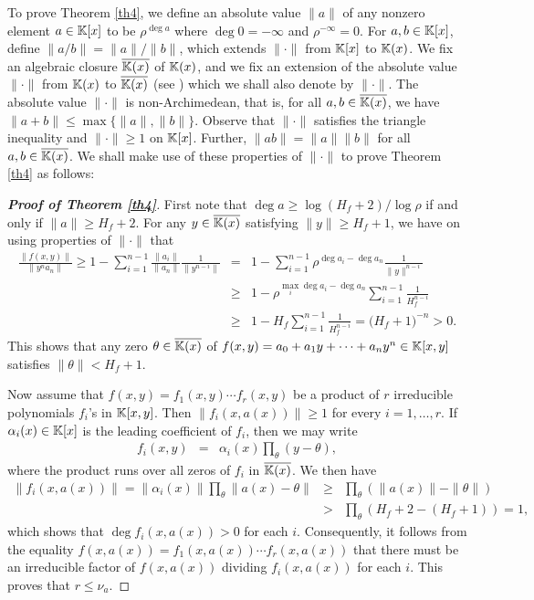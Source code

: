 \documentclass[12pt,reqno]{amsart}%
\begin{document}
To prove Theorem \ref{th4}, we define an absolute value $\|a\|$ of any nonzero element $a\in \mathbb{K}[x]$ to be $\rho^{\deg a}$ where $\deg 0=-\infty$ and $\rho^{-\infty}=0$. For $a,b\in \mathbb{K}[x]$, define $\|a/b\|=\|a\|/\|b\|$, which extends $\|\cdot\|$ from $\mathbb{K}[x]$ to $\mathbb{K}(x)$. We fix an algebraic closure $\overline{\mathbb{K}(x)}$ of $\mathbb{K}(x)$, and we fix an extension of the absolute value $\|\cdot\|$ from $\mathbb{K}(x)$ to $\overline{\mathbb{K}(x)}$ (see \cite{EP}) which we shall also denote by $\|\cdot\|$. The absolute value $\|\cdot\|$ is non-Archimedean, that is, for all $a,b\in \overline{\mathbb{K}(x)}$, we have $\|a+b\|\leq \max\{\|a\|,\|b\|\}$. Observe that $\|\cdot\|$ satisfies the triangle inequality and $\|\cdot\|\geq 1$ on $\mathbb{K}[x]$. Further, $\|ab\|=\|a\|\|b\|$ for all $a,b\in \overline{\mathbb{K}(x)}$. We shall make use of these properties of $\|\cdot\|$ to prove Theorem \ref{th4} as follows:
\begin{proof}[\bf Proof of Theorem \ref{th4}] First note that $\deg a\geq  \log (H_f+2)/\log \rho$ if and only if $\|a\|\geq H_f+2$.  For any $y\in \overline{\mathbb{K}(x)}$ satisfying $\|y\|\geq H_f+1$, we have on using properties of $\|\cdot\|$ that
\begin{eqnarray*}
\frac{\|f(x,y)\|}{\|y^n a_n\|} \geq 1-\sum_{i=1}^{n-1}\frac{\|a_i\|}{\|a_n\|}\frac{1}{\|y^{n-i}\|}
 &= & 1-\sum_{i=1}^{n-1}\rho^{\deg a_i-\deg a_n}\frac{1}{\|y\|^{n-i}}\\
 &\geq & 1-\rho^{\max_{i}\deg a_i-\deg a_n}\sum_{i=1}^{n-1}\frac{1}{H_f^{n-i}}\\
   &\geq & 1-H_f\sum_{i=1}^{n-1}\frac{1}{H_f^{n-i}}= \bigl(H_f+1\bigr)^{-n}>0.
\end{eqnarray*}
This shows that any zero $\theta\in \overline{\mathbb{K}(x)}$ of $f(x,y)=a_0+a_1 y+\cdots+a_ny^n\in \mathbb{K}[x,y]$ satisfies $\|\theta\|<H_f+1$.

Now assume that $f(x,y)=f_1(x,y)\cdots f_r(x,y)$ be a product of $r$ irreducible polynomials $f_i$'s in $\mathbb{K}[x,y]$. Then $\|f_i(x,a(x))\|\geq 1$ for every $i=1,\ldots,r$. If $\alpha_i(x)\in \mathbb{K}[x]$ is the leading coefficient of $f_i$, then we may write
\begin{eqnarray*}
f_i(x,y) &=& \alpha_i(x)\prod_{\theta} (y-\theta),
\end{eqnarray*}
where the product runs over all zeros of $f_i$ in $\overline{\mathbb{K}(x)}$. We then have
\begin{eqnarray*}
\|f_i(x,a(x))\| = \|\alpha_i(x)\|\prod_{\theta} \|a(x)-\theta\|&\geq& \prod_{\theta} (\|a(x)\|-\|\theta\|)\\
&>& \prod_{\theta} (H_f+2-(H_f+1))=1,
\end{eqnarray*}
which shows that $\deg f_i(x,a(x))>0$ for each $i$. Consequently, it follows from the equality $f(x,a(x))=f_1(x,a(x))\cdots f_r(x,a(x))$ that there must be an irreducible factor of $f(x,a(x))$  dividing $f_i(x,a(x))$ for each $i$. This proves that $r\leq \nu_a$.
\end{proof}
\end{document}
